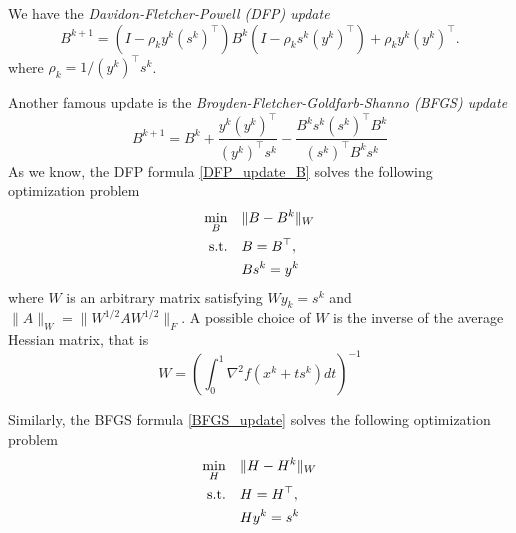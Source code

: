 \documentclass[12pt,a4paper,draft]{article}  %
\theoremstyle{definition}
\numberwithin{equation}{section}
\newcommand{\st}{\textnormal{s.t.}}
\begin{document}
We have the \emph{Davidon-Fletcher-Powell (DFP) update}
\begin{equation}\label{DFP_update_B}
        B^{k+1} = (I - \rho_k y^k (s^k)^\top) B^k (I - \rho_k s^k (y^k)^\top) + \rho_k y^k (y^k)^\top.
\end{equation}
where $\rho_k = 1/(y^k)^\top s^k$. 

Another famous update is the \emph{Broyden-Fletcher-Goldfarb-Shanno (BFGS) update}
\begin{equation}\label{BFGS_update}
        B^{k+1} = B^k + \frac{y^k (y^k)^\top}{(y^k)^\top s^k} - \frac{B^k s^k (s^k)^\top B^k}{(s^k)^\top B^k s^k}
\end{equation}
As we know, the DFP formula \eqref{DFP_update_B} solves the following optimization problem
\begin{equation}\label{DFP_optimization_problem}
        \begin{aligned}
                \min_{B} &\quad \|B - B^k\|_W \\
                \st &\quad B = B^\top, \\
                &\quad B s^k = y^k
        \end{aligned}
\end{equation}
where $W$ is an arbitrary matrix satisfying $Wy_k = s^k$ and $\|A\|_W = \|W^{1/2} A W^{1/2}\|_F$. A possible choice of $W$ is the inverse of the average Hessian matrix, that is 
\begin{equation}\label{W_choice}
        W = \left(\int_0^1 \nabla^2 f(x^k + t s^k) dt\right)^{-1}
\end{equation}

Similarly, the BFGS formula \eqref{BFGS_update} solves the following optimization problem
\begin{equation}\label{BFGS_optimization_problem}
        \begin{aligned}
                \min_{H} &\quad \|H - H^k\|_W \\
                \st &\quad H = H^\top, \\
                &\quad H y^k = s^k
        \end{aligned}
\end{equation}
\end{document}
